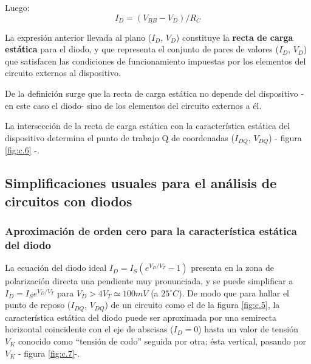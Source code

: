 \documentclass{book} %
\theoremstyle{definition}
\theoremstyle{definition}
\begin{document}
\begin{appendices}
Luego:
\begin{equation}
	\label{eq:c.01}
	I_D=(V_{BB}-V_D)/R_C
\end{equation}

La expresión anterior llevada al plano ($I_D$, $V_D$) constituye la \textbf{recta de carga estática} para el diodo, y que representa el conjunto de pares de valores ($I_D$, $V_D$)  que satisfacen las condiciones de funcionamiento impuestas por los elementos del circuito externos al dispositivo.

De la definición surge que la recta de carga estática no depende del dispositivo - en este caso el diodo- sino de los elementos del circuito externos a él.

La intersección de la recta de carga estática con la característica estática del dispositivo determina el punto de trabajo Q de coordenadas  ($I_{DQ}$, $V_{DQ}$) - figura \ref{fig:c.6} -. 


\subsection{Simplificaciones usuales para el análisis de circuitos con diodos}

\subsubsection{Aproximación de orden cero para la característica estática del diodo}
La ecuación del diodo ideal $I_D=I_S\left(e^{V_D/V_T}-1\right)$ presenta en la zona de polarización directa una pendiente muy pronunciada, y se puede simplificar a $I_D=I_Se^{V_D/V_T}$ para $V_D>4V_T \simeq 100mV$ (a $25^\circ C$). De modo que para hallar el punto de reposo ($I_{DQ}$, $V_{DQ}$) de un circuito como el de la figura \ref{fig:c.5}, la característica estática del diodo puede ser aproximada por una semirecta horizontal coincidente con el eje de abscisas ($I_D=0$) hasta un valor de tensión $V_K$ conocido como ``tensión de codo'' seguida por otra; ésta vertical, pasando por $V_K$ - figura \ref{fig:c.7}-.


\end{appendices}
\end{document}
